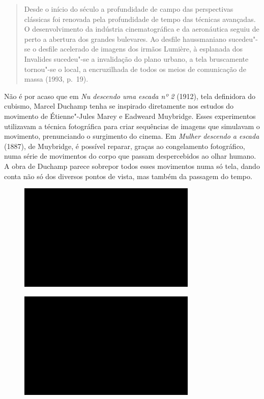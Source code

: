 \begin{quote}
Desde o início do século  a profundidade de campo das perspectivas
clássicas foi renovada pela profundidade de tempo das técnicas
avançadas. O desenvolvimento da indústria cinematográfica e da
aeronáutica seguiu de perto a abertura dos grandes bulevares. Ao desfile
haussmaniano sucedeu"-se o desfile acelerado de imagens dos irmãos
Lumière, à esplanada dos Invalides sucedeu"-se a invalidação do plano
urbano, a tela bruscamente tornou"-se o local, a encruzilhada de todos os
meios de comunicação de massa (1993, p.~19).
\end{quote}

Não é por acaso que em \emph{Nu descendo uma escada nº 2} (1912), tela
definidora do cubismo, Marcel Duchamp tenha se inspirado diretamente nos
estudos do movimento de Étienne"-Jules Marey e Eadweard Muybridge. Esses
experimentos utilizavam a técnica fotográfica para criar sequências de
imagens que simulavam o movimento, prenunciando o surgimento do cinema.
Em \emph{Mulher descendo a escada} (1887), de Muybridge, é possível
reparar, graças ao congelamento fotográfico, numa série de movimentos do
corpo que passam despercebidos ao olhar humano. A obra de Duchamp parece
sobrepor todos esses movimentos numa só tela, dando conta não só dos
diversos pontos de vista, mas também da passagem do tempo.

\begin{figure}[!ht]
\centering
 \includegraphics[width=85mm]{./imgs/im1.jpg}
\caption{\tiny{}}
\end{figure}

\begin{figure}[!ht]
\centering
 \includegraphics[width=85mm]{./imgs/im1.jpg}
\caption{\tiny{}}
\end{figure}


